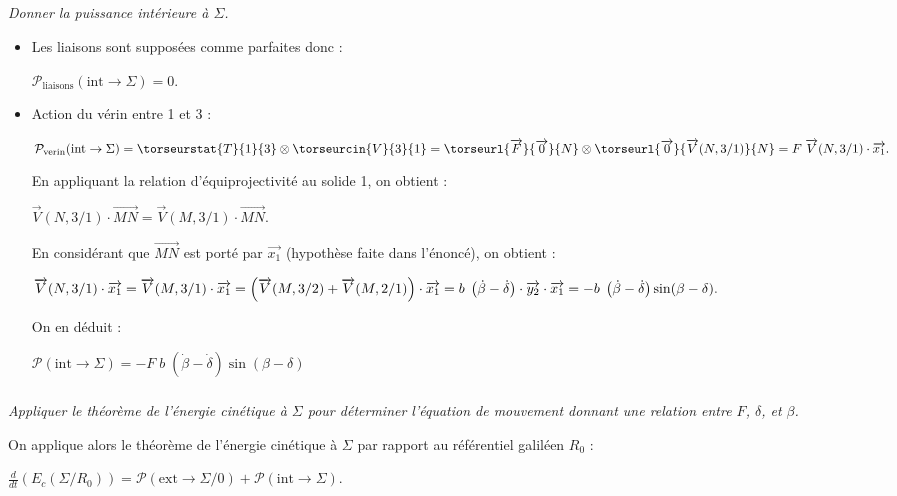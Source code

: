 \begin{multicols}{2}
\subparagraph{}
\textit{Donner la puissance intérieure à $\Sigma$.}
\ifprof
\begin{corrige}
\begin{itemize}
\item Les liaisons sont supposées comme parfaites donc :

$
\mathcal{P}_{\text{liaisons}}(\text{int}\rightarrow \Sigma)=0.
$

\item Action du vérin entre 1 et 3 :

$
\mathcal{P}_\text{verin}(\text{int}\rightarrow \Sigma)=\torseurstat{T}{1}{3}\otimes \torseurcin{V}{3}{1}
=\torseurl{\overrightarrow{F}}{\overrightarrow{0}}{N}\otimes \torseurl{\overrightarrow{0}}{\overrightarrow{V}(N,3/1)}{N}
=F\;\overrightarrow{V}(N,3/1)\cdot\overrightarrow{x_1}.
$

En appliquant la relation d'équiprojectivité au solide 1, on obtient :

$
\overrightarrow{V}(N,3/1)\cdot\overrightarrow{MN}=\overrightarrow{V}(M,3/1)\cdot\overrightarrow{MN}.
$

En considérant que $\overrightarrow{MN}$ est porté par $\overrightarrow{x_1}$ (hypothèse faite dans l'énoncé), on obtient :

$
\overrightarrow{V}(N,3/1)\cdot\overrightarrow{x_1}=\overrightarrow{V}(M,3/1)\cdot\overrightarrow{x_1}=\left(\overrightarrow{V}(M,3/2)+\overrightarrow{V}(M,2/1)\right)\cdot\overrightarrow{x_1}\\
=b\;\left(\dot{\beta}-\dot{\delta}\right)\cdot\overrightarrow{y_2}\cdot\overrightarrow{x_1}=-b\;\left(\dot{\beta}-\dot{\delta}\right)\sin(\beta-\delta).
$


On en déduit :

$
\mathcal{P}(\text{int}\rightarrow \Sigma)=-F\;b\;\left(\dot{\beta}-\dot{\delta}\right)\sin(\beta-\delta)
$

\end{itemize}
\end{corrige}
\else
\fi

\subparagraph{}
\textit{Appliquer le théorème de l'énergie cinétique à $\Sigma$ pour déterminer l'équation de mouvement donnant une relation entre $F$, $\delta$, et $\beta$.}
\ifprof
\begin{corrige}
On applique alors le théorème de l'énergie cinétique à $\Sigma$ par rapport au référentiel galiléen $R_0$ :

$
\frac{d}{dt}(E_c(\Sigma/R_0))=\mathcal{P}(\text{ext}\rightarrow \Sigma/0)+\mathcal{P}(\text{int}\rightarrow \Sigma).
$


\end{corrige}
\end{multicols}
